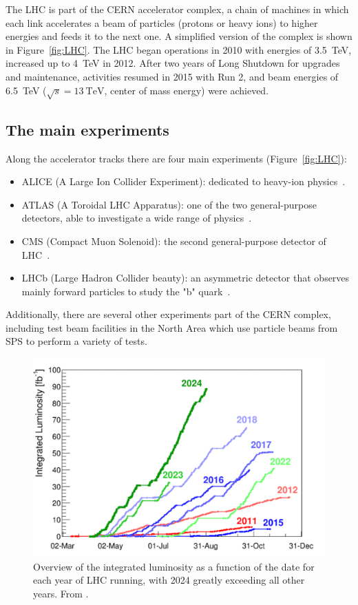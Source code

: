The LHC is part of the CERN accelerator complex, a chain of machines in which each link accelerates a beam of particles (protons or heavy ions) to higher energies and feeds it to the next one. A simplified version of the complex is shown in Figure~\ref{fig:LHC}. The LHC began operations in 2010 with energies of \qty{3.5}{\tera\electronvolt}, increased up to \qty{4}{\tera\electronvolt} in 2012. After two years of Long Shutdown for upgrades and maintenance, activities resumed in 2015 with Run 2, and beam energies of \qty{6.5}{\tera\electronvolt} (\(\sqrt{s}=\qty{13}{\tera\electronvolt}\), center of mass energy) were achieved.


\subsection{The main experiments}\label{subsec:LHC_main_experiments}

Along the accelerator tracks there are four main experiments (Figure~\ref{fig:LHC}):
\begin{itemize}
    \item ALICE (A Large Ion Collider Experiment): dedicated to heavy-ion physics~\cite{aliceFrontpageAlicepublicwebcernch}.
    \item ATLAS (A Toroidal LHC Apparatus): one of the two general-purpose detectors, able to investigate a wide range of physics~\cite{atlasATLASExperiment}.
    \item CMS (Compact Muon Solenoid): the second general-purpose detector of LHC~\cite{cmsDetectorExperiment}.
    \item LHCb (Large Hadron Collider beauty): an asymmetric detector that observes mainly forward particles to study the "b" quark~\cite{cernLHCbCollaboration}.
\end{itemize}

Additionally, there are several other experiments part of the CERN complex, including test beam facilities in the North Area which use particle beams from SPS to perform a variety of tests.

\begin{figure}[h!tbp]
    \centering
    \includegraphics[width=.6\linewidth]{Images/intro/integrated_luminosity.png}
    \captionsetup{width=\captionwidth}
    \caption{Overview of the integrated luminosity as a function of the date for each year of LHC running, with 2024 greatly exceeding all other years. From \cite{homeAcceleratorReport}.}
    \label{fig:integrated_luminosity}
\end{figure}


